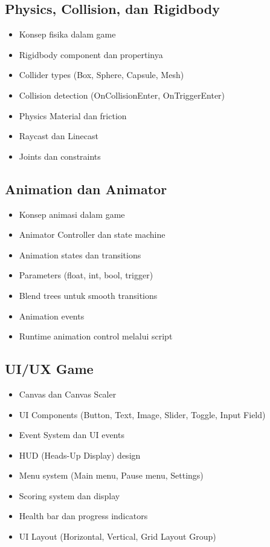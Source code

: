 \documentclass[a4paper,12pt]{article}
\begin{document}
\subsection{Physics, Collision, dan Rigidbody}
\begin{itemize}
\item Konsep fisika dalam game
\item Rigidbody component dan propertinya
\item Collider types (Box, Sphere, Capsule, Mesh)
\item Collision detection (OnCollisionEnter, OnTriggerEnter)
\item Physics Material dan friction
\item Raycast dan Linecast
\item Joints dan constraints
\end{itemize}

\subsection{Animation dan Animator}
\begin{itemize}
\item Konsep animasi dalam game
\item Animator Controller dan state machine
\item Animation states dan transitions
\item Parameters (float, int, bool, trigger)
\item Blend trees untuk smooth transitions
\item Animation events
\item Runtime animation control melalui script
\end{itemize}

\subsection{UI/UX Game}
\begin{itemize}
\item Canvas dan Canvas Scaler
\item UI Components (Button, Text, Image, Slider, Toggle, Input Field)
\item Event System dan UI events
\item HUD (Heads-Up Display) design
\item Menu system (Main menu, Pause menu, Settings)
\item Scoring system dan display
\item Health bar dan progress indicators
\item UI Layout (Horizontal, Vertical, Grid Layout Group)
\end{itemize}
\end{document}
